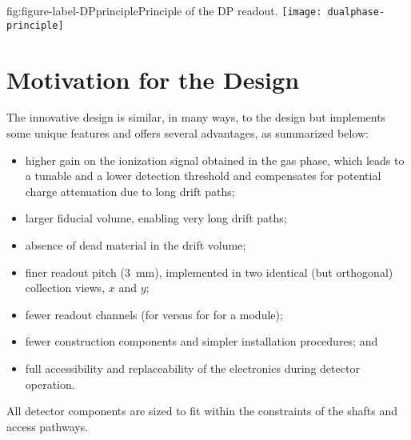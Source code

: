 \begin{dunefigure}{fig:figure-label-DPprinciple}{Principle of the DP readout.}
\texttt{[image: dualphase-principle]}
\end{dunefigure}

\section{Motivation for the \dual Design} 
\label{sec:dp-execsum-design-motivation}

The innovative  design is similar, in many ways, to the  design but implements some unique features and offers several advantages, as summarized below:

\begin{itemize}
\item higher gain on the ionization signal obtained in the gas phase, which
  leads to a tunable  and a lower detection threshold and
  compensates for potential charge attenuation due to long drift paths; 
\item  larger fiducial volume, enabling very long drift paths;
\item  absence of dead material in the  drift volume;
\item  finer readout pitch (\SI{3}{mm}), implemented in two identical (but orthogonal) collection views, $x$ and $y$;
\item  fewer readout channels (\dpnumcrpch for  versus \spnumch for  for a  \nominalmodsize module); 
\item  fewer construction %
components and simpler installation procedures; and 
\item  full accessibility and replaceability of the  electronics during detector operation.
\end{itemize}


All detector components are sized to fit within the constraints of the  shafts and access pathways. %


